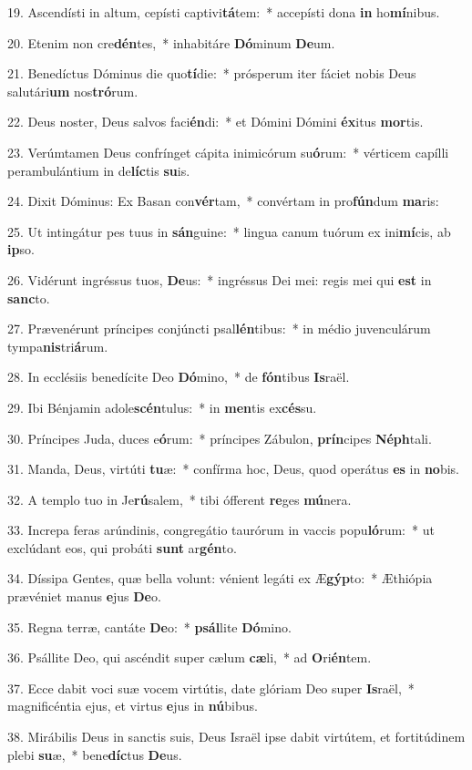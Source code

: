 19. Ascendísti in altum, cepísti captivi\textbf{tá}tem:~*  accepísti dona \textbf{in} ho\textbf{mí}nibus.\

20. Etenim non cre\textbf{dén}tes,~*  inhabitáre \textbf{Dó}minum \textbf{De}um.\

21. Benedíctus Dóminus die quo\textbf{tí}die:~*  prósperum iter fáciet nobis Deus salutári\textbf{um} nos\textbf{tró}rum.\

22. Deus noster, Deus salvos faci\textbf{én}di:~*  et Dómini Dómini \textbf{éx}itus \textbf{mor}tis.\

23. Verúmtamen Deus confrínget cápita inimicórum su\textbf{ó}rum:~*  vérticem capílli perambulántium in de\textbf{líc}tis \textbf{su}is.\

24. Dixit Dóminus: Ex Basan con\textbf{vér}tam,~*  convértam in pro\textbf{fún}dum \textbf{ma}ris:\

25. Ut intingátur pes tuus in \textbf{sán}guine:~*  lingua canum tuórum ex ini\textbf{mí}cis, ab \textbf{ip}so.\

26. Vidérunt ingréssus tuos, \textbf{De}us:~*  ingréssus Dei mei: regis mei qui \textbf{est} in \textbf{sanc}to.\

27. Prævenérunt príncipes conjúncti psal\textbf{lén}tibus:~*  in médio juvenculárum tympa\textbf{nis}tri\textbf{á}rum.\

28. In ecclésiis benedícite Deo \textbf{Dó}mino,~*  de \textbf{fón}tibus \textbf{Is}raël.\

29. Ibi Bénjamin adole\textbf{scén}tulus:~*  in \textbf{men}tis ex\textbf{cés}su.\

30. Príncipes Juda, duces e\textbf{ó}rum:~*  príncipes Zábulon, \textbf{prín}cipes \textbf{Néph}tali.\

31. Manda, Deus, virtúti \textbf{tu}æ:~*  confírma hoc, Deus, quod operátus \textbf{es} in \textbf{no}bis.\

32. A templo tuo in Je\textbf{rú}salem,~*  tibi ófferent \textbf{re}ges \textbf{mú}nera.\

33. Increpa feras arúndinis, congregátio taurórum in vaccis popu\textbf{ló}rum:~*  ut exclúdant eos, qui probáti \textbf{sunt} ar\textbf{gén}to.\

34. Díssipa Gentes, quæ bella volunt: vénient legáti ex Æ\textbf{gýp}to:~*  Æthiópia prævéniet manus \textbf{e}jus \textbf{De}o.\

35. Regna terræ, cantáte \textbf{De}o:~*  \textbf{psál}lite \textbf{Dó}mino.\

36. Psállite Deo, qui ascéndit super cælum \textbf{cæ}li,~*  ad \textbf{O}ri\textbf{én}tem.\

37. Ecce dabit voci suæ vocem virtútis, date glóriam Deo super \textbf{Is}raël,~*  magnificéntia ejus, et virtus \textbf{e}jus in \textbf{nú}bibus.\

38. Mirábilis Deus in sanctis suis, Deus Israël ipse dabit virtútem, et fortitúdinem plebi \textbf{su}æ,~*  bene\textbf{díc}tus \textbf{De}us.\


